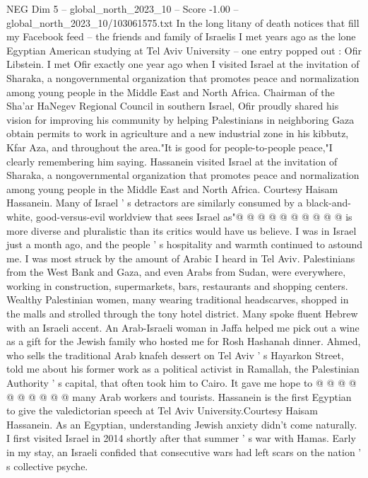 \begin{textsample}{NEG Dim 5 – global\_north\_2023\_10 – Score -1.00 – global\_north\_2023\_10/103061575.txt}  \label{ex:f5_neg_024}
In the long litany of death notices that fill my Facebook feed -- the friends and family of Israelis I met years ago as the lone Egyptian American studying at Tel Aviv University -- one entry popped out : Ofir Libstein.
I met Ofir exactly one year ago when I visited Israel at the invitation of Sharaka, a nongovernmental organization that promotes peace and normalization among young people in the Middle East and North Africa.
Chairman of the Sha'ar HaNegev Regional Council in southern Israel, Ofir proudly shared his vision for improving his community by helping Palestinians in neighboring Gaza obtain permits to work in agriculture and a new industrial zone in his kibbutz, Kfar Aza, and throughout the area."It is good for people-to-people peace,"I clearly remembering him saying.
Hassanein visited Israel at the invitation of Sharaka, a nongovernmental organization that promotes peace and normalization among young people in the Middle East and North Africa.
Courtesy Haisam Hassanein.
Many of Israel ' s detractors are similarly consumed by a black-and-white, good-versus-evil worldview that sees Israel as"@ @ @ @ @ @ @ @ @ @ is more diverse and pluralistic than its critics would have us believe.
I was in Israel just a month ago, and the people ' s hospitality and warmth continued to astound me.
I was most struck by the amount of Arabic I heard in Tel Aviv.
Palestinians from the West Bank and Gaza, and even Arabs from Sudan, were everywhere, working in construction, supermarkets, bars, restaurants and shopping centers.
Wealthy Palestinian women, many wearing traditional headscarves, shopped in the malls and strolled through the tony hotel district.
Many spoke fluent Hebrew with an Israeli accent.
An Arab-Israeli woman in Jaffa helped me pick out a wine as a gift for the Jewish family who hosted me for Rosh Hashanah dinner.
Ahmed, who sells the traditional Arab knafeh dessert on Tel Aviv ' s Hayarkon Street, told me about his former work as a political activist in Ramallah, the Palestinian Authority ' s capital, that often took him to Cairo.
It gave me hope to @ @ @ @ @ @ @ @ @ @ many Arab workers and tourists.
Hassanein is the first Egyptian to give the valedictorian speech at Tel Aviv University.Courtesy Haisam Hassanein.
As an Egyptian, understanding Jewish anxiety didn't come naturally.
I first visited Israel in 2014 shortly after that summer ' s war with Hamas.
Early in my stay, an Israeli confided that consecutive wars had left scars on the nation ' s collective psyche.

\end{textsample}
